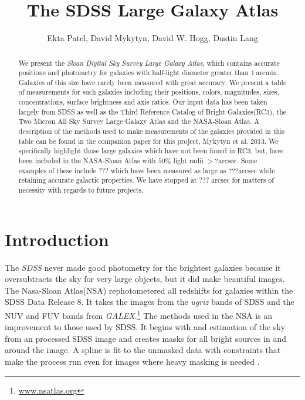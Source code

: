 \documentclass[12pt,preprint,pdftex]{aastex}
\newcounter{address}
\newcommand{\project}[1]{\textsl{#1}}
\newcommand{\units}[1]{\mathrm{#1}}
\renewcommand{\arcmin}{\units{arcmin}}
\renewcommand{\arcsec}{\units{arcsec}}
\begin{document}
\title{
       The SDSS Large Galaxy Atlas
      }
\author{
        Ekta Patel\altaffilmark{\ref{CCPP}},
        David Mykytyn\altaffilmark{\ref{CCPP}},
        David W. Hogg\altaffilmark{\ref{CCPP},\ref{MPIA},\ref{email}},
        Dustin Lang\altaffilmark{\ref{CMU}}
       }
\setcounter{address}{1}

\begin{abstract}
We present the \project{Sloan Digital Sky Survey Large Galaxy Atlas}, which contains
accurate positions and photometry for galaxies with half-light diameter
greater than $1~\arcmin$. Galaxies of this size have rarely been measured with great accuracy. We present a table of measurements for such galaxies including their positions, colors, magnitudes, sizes, concentrations, surface brightness and axis ratios. Our input data has been taken largely from SDSS as well as the Third Reference Catalog of Bright Galaxies(RC3), the Two Micron All Sky Survey Large Galaxy Atlas and the NASA-Sloan Atlas. A description of the methods used to make measurements of the galaxies provided in this table can be found in the companion paper for this project, Mykytyn et al. 2013. We specifically highlight those large galaxies which have not been found in RC3, but, have been included in the NASA-Sloan Atlas with $50\%$ light radii $>? \arcsec$. Some examples of these include ??? which have been measured as large as $???\arcsec$ while retaining accurate galactic properties. We have stopped at ??? $\arcsec$ for matters of necessity with regards to future projects.

\end{abstract}

\section{Introduction}

The \project{SDSS} never made good photometry for the brightest galaxies because it oversubtracts the sky for very large objects, but it did make beautiful images. The Nasa-Sloan Atlas(NSA) rephotometered all redshifts for galaxies within the SDSS Data Release 8. It takes the images from the \textit{ugriz} bands of SDSS and the NUV and FUV bands from \textit{GALEX}.\footnote{\url{www.nsatlas.org}} The methods used in the NSA is an improvement to those used by SDSS. It begins with and estimation of the sky from an processed SDSS image and creates masks for all bright sources in and around the image. A spline is fit to the unmasked data with constraints that make the process run even for images where heavy masking is needed \citep{blanton11}. 
\end{document}
